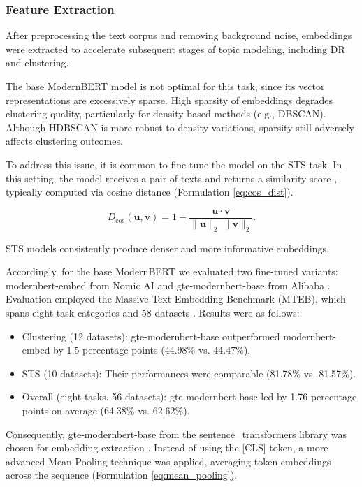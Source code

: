 \subsubsection{Feature Extraction}
After preprocessing the text corpus and removing background noise, embeddings were extracted
to accelerate subsequent stages of topic modeling, including DR and clustering.

The base ModernBERT model is not optimal for this task, since its vector representations are excessively
sparse. High sparsity of embeddings degrades clustering quality, particularly for density-based methods
(e.g., DBSCAN). Although HDBSCAN is more robust to density variations, sparsity still adversely affects
clustering outcomes.

To address this issue, it is common to fine-tune the model on the STS task.
In this setting, the model receives a pair of texts and returns a similarity score \parencite{MTEB2023},
typically computed via cosine distance (Formulation \ref{eq:cos_dist}).

\begin{equation}\label{eq:cos_dist}
    D_{\cos}(\mathbf{u}, \mathbf{v})
    = 1 - \frac{\mathbf{u} \cdot \mathbf{v}}
                 {\|\mathbf{u}\|_2 \,\|\mathbf{v}\|_2}.
\end{equation}

STS models consistently produce denser and more informative embeddings.

Accordingly, for the base ModernBERT we evaluated two fine-tuned variants: modernbert-embed from Nomic AI
\parencite{nomic2024} and gte-modernbert-base from Alibaba \parencite{MGTE2023,MGTE2024}. Evaluation
employed the Massive Text Embedding Benchmark (MTEB), which spans eight task categories and 58 datasets
\parencite{MTEB2023}. Results were as follows:

\begin{itemize}
    \item Clustering (12 datasets): gte-modernbert-base outperformed modernbert-embed by 1.5 percentage
    points (44.98\% vs. 44.47\%).
    \item STS (10 datasets): Their performances were comparable (81.78\% vs. 81.57\%).
    \item Overall (eight tasks, 56 datasets): gte-modernbert-base led by 1.76 percentage points on average
    (64.38\% vs. 62.62\%).
\end{itemize}

Consequently, gte-modernbert-base from the sentence\_transformers library was chosen for embedding extraction
\parencite{SBERT2019}. Instead of using the [CLS] token, a more advanced Mean Pooling technique was applied,
averaging token embeddings across the sequence (Formulation \ref{eq:mean_pooling}).

